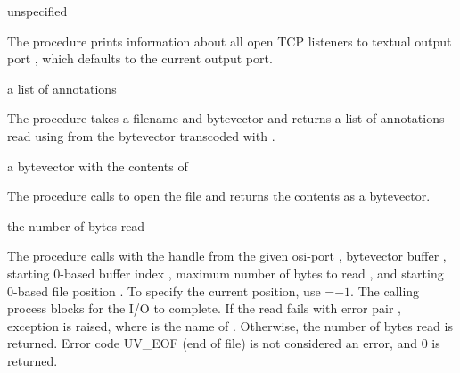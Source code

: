 \begin{procedure}
\end{procedure}
\returns{} unspecified

The  procedure prints information about all
open TCP listeners to textual output port
, which defaults to the current output port.

\begin{procedure}
\end{procedure}
\returns{} a list of annotations

The  procedure takes a filename  and
 bytevector and returns a list of annotations read using
 from the  bytevector
transcoded with .

\begin{procedure}
\end{procedure}
\returns{} a bytevector with the contents of 

The  procedure calls  to open the file  and returns the contents
as a bytevector.

\begin{procedure}
\end{procedure}
\returns{} the number of bytes read

The  procedure calls  with
the handle from the given osi-port , bytevector buffer
, starting 0-based buffer index , maximum number of
bytes to read , and starting 0-based file position . To
specify the current position, use =$-1$. The calling process
blocks for the I/O to complete. If the read fails with error pair
, exception  is raised, where  is
the name of . Otherwise, the number of bytes read is
returned. Error code UV\_EOF (end of file) is not considered an error,
and 0 is returned.

